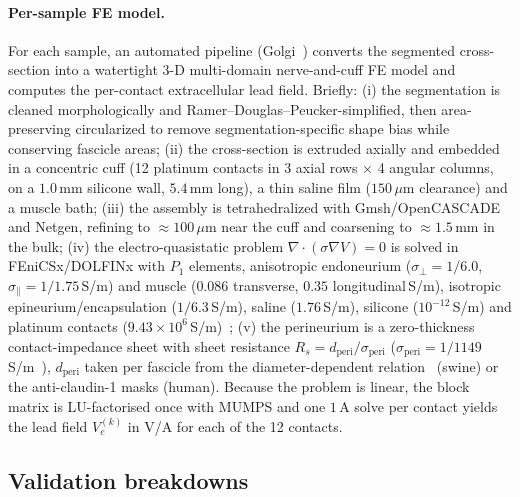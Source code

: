 \paragraph{Per-sample FE model.}
For each sample, an automated pipeline (Golgi~\cite{lung2026golgi})
converts the segmented cross-section into a watertight 3-D multi-domain
nerve-and-cuff FE model and computes the per-contact extracellular
lead field.  Briefly: (i) the segmentation is cleaned morphologically
and Ramer--Douglas--Peucker-simplified, then area-preserving
circularized to remove segmentation-specific shape bias while
conserving fascicle areas; (ii) the cross-section is extruded axially
and embedded in a concentric cuff (12 platinum contacts in 3 axial
rows $\times$ 4 angular columns, on a $1.0\,\mathrm{mm}$ silicone wall,
$5.4\,\mathrm{mm}$ long), a thin saline film ($150\,\mu\mathrm{m}$
clearance) and a muscle bath; (iii) the assembly is tetrahedralized
with Gmsh/OpenCASCADE and Netgen, refining to
${\approx}100\,\mu\mathrm{m}$ near the cuff and coarsening to
${\approx}1.5\,\mathrm{mm}$ in the bulk; (iv) the electro-quasistatic
problem $\nabla \cdot (\sigma \nabla V) = 0$ is solved in
FEniCSx/DOLFINx with $P_1$ elements, anisotropic endoneurium
($\sigma_{\perp} = 1/6.0$, $\sigma_{\parallel} = 1/1.75$\,S/m) and
muscle ($0.086$ transverse, $0.35$ longitudinal\,S/m), isotropic
epineurium/encapsulation ($1/6.3$\,S/m), saline ($1.76$\,S/m),
silicone ($10^{-12}$\,S/m) and platinum contacts
($9.43 \times 10^{6}$\,S/m)~\cite{pelot2020perineurium,grill1994stimulus,gielen1984incorporation,horch2017neuroprosthetics};
(v) the perineurium is a zero-thickness contact-impedance sheet with
sheet resistance $R_s = d_{\mathrm{peri}} / \sigma_{\mathrm{peri}}$
($\sigma_{\mathrm{peri}} = 1/1149$\,S/m~\cite{pelot2020perineurium}),
$d_{\mathrm{peri}}$ taken per fascicle from the diameter-dependent
relation~\cite{pelot2020perineurium} (swine) or the anti-claudin-1
masks (human).  Because the problem is linear, the block matrix is
LU-factorised once with MUMPS and one $1\,\mathrm{A}$ solve per contact
yields the lead field $V_e^{(k)}$ in V/A for each of the 12 contacts.

\subsection*{Validation breakdowns}
\label{sec:app-validation}

